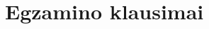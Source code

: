 \chapter{Egzamino klausimai}

\setcounter{questioncounter}{0}
\newenvironment{question}[2]
{
\refstepcounter{questioncounter}
\thequestioncounter{}. \hspace{3em}\emph{#1}\\
\label{#2}
}
{}
